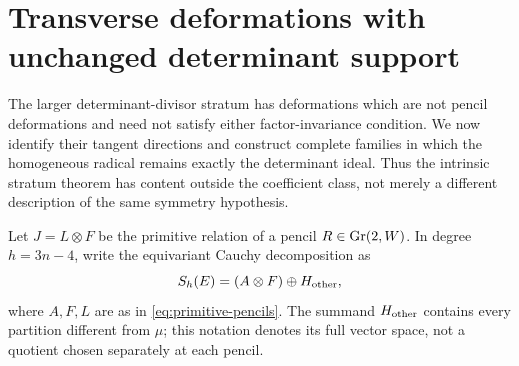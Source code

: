 \documentclass[11pt,reqno]{amsart}
\numberwithin{equation}{section}
\theoremstyle{definition}\newtheorem{definition}[theorem]{Definition}
\theoremstyle{remark}\newtheorem{remark}[theorem]{Remark}
\begin{document}
\section{Transverse deformations with unchanged determinant support}
\label{sec:transverse-relations}

The larger determinant-divisor stratum has deformations which are
not pencil deformations and need not satisfy either factor-invariance
condition.  We now identify their tangent directions and construct
complete families in which the homogeneous radical remains exactly
the determinant ideal.  Thus the intrinsic stratum theorem has content
outside the coefficient class, not merely a different description
of the same symmetry hypothesis.

Let \(J=L\otimes F\) be the primitive relation of a pencil
\(R\in\operatorname{Gr}(2,W)\).  In degree \(h=3n-4\), write the equivariant
Cauchy decomposition as
\[
                    S_h(E)=(A\otimes F)\oplus H_{\rm other},
\]
where \(A,F,L\) are as in \eqref{eq:primitive-pencils}.
The summand \(H_{\rm other}\) contains every partition different
from \(\mu\); this notation denotes its full vector space, not a
quotient chosen separately at each pencil.
\end{document}
